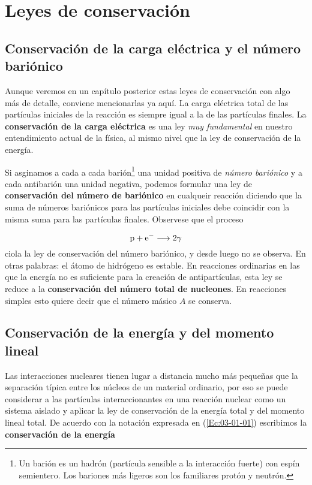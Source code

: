 

\section{Leyes de conservación}

\subsection{Conservación de la carga eléctrica y el número bariónico}

Aunque veremos en un capítulo posterior estas leyes de conservación con algo más de detalle, conviene mencionarlas ya aquí. La carga eléctrica total de las partículas iniciales de la reacción es siempre igual a la de las partículas finales. La \textbf{conservación de la carga eléctrica} es una ley \textit{muy fundamental} en nuestro entendimiento actual de la física, al mismo nivel que la ley de conservación de la energía.


Si asginamos a cada a cada barión\footnote{Un barión es un hadrón (partícula sensible a la interacción fuerte) con espín semientero. Los bariones más ligeros son los familiares protón y neutrón.} una unidad positiva de \textit{número bariónico} y a cada antibarión una unidad negativa, podemos formular una ley de \textbf{conservación del número de bariónico} en cualqueir reacción diciendo que la suma de números bariónicos para las partículas iniciales debe coincidir con la misma suma para las partículas finales. Observese que el proceso 
 
\begin{equation}
    \text{p} + \text{e}^- \longrightarrow  2 \gamma
\end{equation}
ciola la ley de conservación del número bariónico, y desde luego no se observa. En otras palabras: el átomo de hidrógeno es estable. En reacciones ordinarias en las que la energía no es suficiente para la creación de antipartículas, esta ley se reduce a la \textbf{conservación del número total de nucleones}. En reacciones simples esto quiere decir que el número másico $A$ se conserva.

\subsection{Conservación de la energía y del momento lineal}

Las interacciones nucleares tienen lugar a distancia mucho más pequeñas que la separación típica entre los núcleos de un material ordinario, por eso se puede considerar a las partículas interaccionantes en una reacción nuclear como un sistema aislado y aplicar la ley de conservación de la energía total y del momento lineal total. De acuerdo con la notación expresada en (\ref{Ec:03-01-01}) escribimos la \textbf{conservación de la energía}

